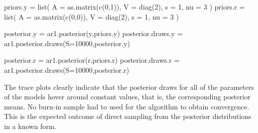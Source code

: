 \documentclass[
  letterpaper,
  DIV=11,
  numbers=noendperiod]{scrreprt}
\newenvironment{Shaded}{\begin{snugshade}}{\end{snugshade}}
\newcommand{\AttributeTok}[1]{\textcolor[rgb]{0.40,0.45,0.13}{#1}}
\newcommand{\DecValTok}[1]{\textcolor[rgb]{0.68,0.00,0.00}{#1}}
\newcommand{\FunctionTok}[1]{\textcolor[rgb]{0.28,0.35,0.67}{#1}}
\newcommand{\NormalTok}[1]{\textcolor[rgb]{0.00,0.23,0.31}{#1}}
\newcommand{\OtherTok}[1]{\textcolor[rgb]{0.00,0.23,0.31}{#1}}
\begin{document}
\begin{Shaded}
\begin{Highlighting}[]
\NormalTok{priors.y }\OtherTok{=} \FunctionTok{list}\NormalTok{(}
  \AttributeTok{A    =} \FunctionTok{as.matrix}\NormalTok{(}\FunctionTok{c}\NormalTok{(}\DecValTok{0}\NormalTok{,}\DecValTok{1}\NormalTok{)),}
  \AttributeTok{V    =} \FunctionTok{diag}\NormalTok{(}\DecValTok{2}\NormalTok{),}
  \AttributeTok{s    =} \DecValTok{1}\NormalTok{,}
  \AttributeTok{nu   =} \DecValTok{3}
\NormalTok{)}
\NormalTok{priors.r }\OtherTok{=} \FunctionTok{list}\NormalTok{(}
  \AttributeTok{A    =} \FunctionTok{as.matrix}\NormalTok{(}\FunctionTok{c}\NormalTok{(}\DecValTok{0}\NormalTok{,}\DecValTok{0}\NormalTok{)),}
  \AttributeTok{V    =} \FunctionTok{diag}\NormalTok{(}\DecValTok{2}\NormalTok{),}
  \AttributeTok{s    =} \DecValTok{1}\NormalTok{,}
  \AttributeTok{nu   =} \DecValTok{3}
\NormalTok{)}

\NormalTok{posterior.y         }\OtherTok{=} \FunctionTok{ar1.posterior}\NormalTok{(y,priors.y)}
\NormalTok{posterior.draws.y   }\OtherTok{=} \FunctionTok{ar1.posterior.draws}\NormalTok{(}\AttributeTok{S=}\DecValTok{10000}\NormalTok{,posterior.y)}

\NormalTok{posterior.r         }\OtherTok{=} \FunctionTok{ar1.posterior}\NormalTok{(r,priors.r)}
\NormalTok{posterior.draws.r   }\OtherTok{=} \FunctionTok{ar1.posterior.draws}\NormalTok{(}\AttributeTok{S=}\DecValTok{10000}\NormalTok{,posterior.r)}
\end{Highlighting}
\end{Shaded}

The trace plots clearly indicate that the posterior draws for all of the
parameters of the models hover around constant values, that is, the
corresponding posterior means. No burn-in sample had to used for the
algorithm to obtain convergence. This is the expected outcome of direct
sampling from the posterior distributions in a known form.
\end{document}
